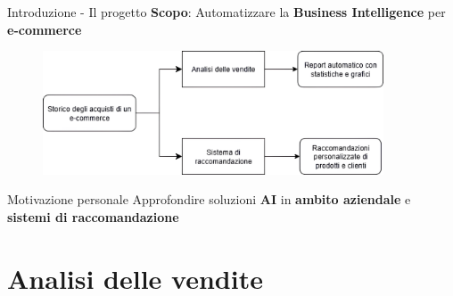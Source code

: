 \documentclass{beamer}
\begin{document}
	\begin{frame}{Introduzione - Il progetto}
		\textbf{Scopo}: Automatizzare la \textbf{Business Intelligence} per \textbf{e-commerce}

		\begin{figure}
			\centering
			\includegraphics[width=0.9\textwidth]{Diagramma di flusso del progetto.png}
		\end{figure}

		\begin{block}{Motivazione personale}
			Approfondire soluzioni \textbf{AI} in \textbf{ambito aziendale} e \textbf{sistemi di raccomandazione}
		\end{block}
	\end{frame}


	\section{Analisi delle vendite}
\end{document}
